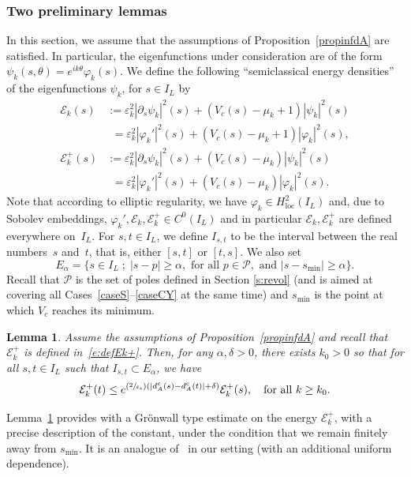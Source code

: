 \documentclass[10pt]{amsart}
\newcommand{\Psfrac}[2]{(\sfrac{#1}{#2})}
\newcommand{\sep}{\;;\;}
\newtheorem{lemma}{Lemma}[section]
\theoremstyle{definition}
\newcommand{\Ek}{\mathcal{E}_k}
\newcommand{\loc}{\mathrm{loc}}
\newcommand{\ce}{c}
\let\d\partial
\let\e\varepsilon
\let\eps\varepsilon
\begin{document}
\subsubsection{Two preliminary lemmas}
In this section, we assume that the assumptions of Proposition~\ref{propinfdA} are satisfied. In particular, the eigenfunctions under consideration are of the form $\psi_k(s, \theta) = e^{ik \theta}\varphi_k(s)$.
We define the following ``semiclassical energy densities'' of the eigenfunctions $\psi_k$, for $s \in I_L$ by
\begin{align}
\label{e:defEk}\Ek(s)&:= \eps_k^2 |\d_s \psi_k|^2(s)+ (V_\ce(s) -\mu_k+1)|\psi_k|^2(s) \\
& \phantom{:}= \eps_k^2 |\varphi_k'|^2(s)+ (V_\ce(s) -\mu_k+1)|\varphi_k|^2(s),\nonumber \\
\label{e:defEk+} \Ek^+(s)&:=\eps_k^2 |\d_s \psi_k|^2(s)+(V_\ce(s) -\mu_k)|\psi_k|^2(s) \\
& \phantom{:}=\eps_k^2 |\varphi_k'|^2(s)+(V_\ce(s) -\mu_k)|\varphi_k|^2(s). \nonumber
\end{align}
Note that according to elliptic regularity, we have $\varphi_k \in H^2_{\loc}(I_L)$ and, due to Sobolev embeddings, $\varphi_k', \Ek, \Ek^+ \in C^0(I_L)$ and in particular $\Ek, \Ek^+$ are defined everywhere on~$I_L$.
For $s, t \in I_L$, we define $I_{s,t}$ to be the interval between the real numbers~$s$ and~$t$, that is, either $[s,t]$ or $[t,s]$.
We also set
\begin{equation}
\label{e:def-E-alpha}
E_\alpha = \{ s \in I_L \sep |s-p| \geq \alpha, \text{ for all } p\in\mathcal{P}, \text{ and }|s-s_{\min}|\geq \alpha \}.
\end{equation}
Recall that $\mathcal{P}$ is the set of poles defined in Section \ref{s:revol} (and is aimed at covering all Cases~\ref{caseS}--\ref{caseCY}
at the same time) and $s_{\min}$ is the point at which $V_{\ce}$ reaches its minimum.
\begin{lemma}
\label{GronwallAgmon}
Assume the assumptions of Proposition~\ref{propinfdA} and recall that $\Ek^+$ is defined in~\eqref{e:defEk+}.
Then, for any $\alpha,\delta>0$, there exists $k_0>0$ so that for all $s,t \in I_L$ such that $I_{s,t} \subset E_\alpha$, we have
\[
\Ek^+(t)\leq e^{\Psfrac{2}{\e_k}\left(|d_A^{\ce}(s)-d_A^{\ce}(t)|+\delta\right)}\Ek^+(s), \quad \text{for all }k\geq k_0.
\]
\end{lemma}
Lemma~\ref{GronwallAgmon} provides with a Grönwall type estimate on the energy $\Ek^+$, with a precise description of the constant, under the condition that we remain finitely away from $s_{\min}$. It is an analogue of~\cite[Lem.\,12]{Allibert:98} in our setting (with an additional uniform dependence).
\end{document}
